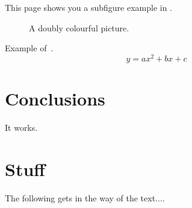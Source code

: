 \documentclass{ecsarticle}     %
\begin{document}
This page shows you a subfigure example in .
\begin{figure}[!htb]
  \centering
  \caption{A doubly colourful picture.}
  \label{Figure:figsubex}
\end{figure}

Example of~.
\begin{equation}
y = ax^2 + bx + c
\label{eq:equation1}
\end{equation}

\section{Conclusions} \label{Section: Conclusions}
It works.
\backmatter


\appendix
\section{Stuff} \label{Section:Stuff}
The following gets in the way of the text....
\end{document}
